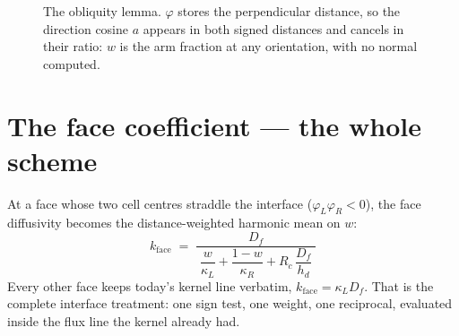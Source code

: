 \documentclass[11pt,a4paper]{article}
\newcommand{\nn}{\boldsymbol{n}}
\begin{document}
\begin{figure}[t]
\centering
{}
\caption{The obliquity lemma. $\varphi$ stores the perpendicular distance, so
the direction cosine $a$ appears in both signed distances and cancels in their
ratio: $w$ is the arm fraction at any orientation, with no normal computed.}
\end{figure}

\section{The face coefficient --- the whole scheme}
\label{sec:coefficient}

At a face whose two cell centres straddle the interface
($\varphi_L\varphi_R<0$), the face diffusivity becomes the
distance-weighted harmonic mean on $w$:
\begin{equation}
  \boxed{\;
    k_{\text{face}}
    \;=\;
    \frac{D_f}{\;\dfrac{w}{\kappa_L}+\dfrac{1-w}{\kappa_R}
          + R_c\,\dfrac{D_f}{h_d}\;}\;}
  \label{eq:kface}
\end{equation}
Every other face keeps today's kernel line verbatim,
$k_{\text{face}} = \kappa_L D_f$. That is the complete interface treatment:
one sign test, one weight, one reciprocal, evaluated inside the flux line the
kernel already had.
\end{document}
